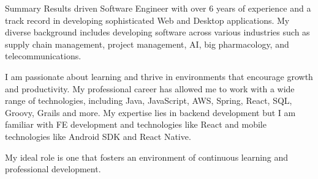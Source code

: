 \documentclass[]{mcdowellcv}
\begin{document}
   \makeheader

  \begin{cvsection}{Summary}
	    \hspace{\parindent} \hspace{\parindent} \hspace{\parindent} \hspace{\parindent} 
		Results driven Software Engineer with over 6 years of experience and a track record in developing sophisticated Web and Desktop applications. My diverse background includes developing software across various industries such as supply chain management, project management, AI, big pharmacology, and telecommunications.

		I am passionate about learning and thrive in environments that encourage growth and productivity. My professional career has allowed me to work with a wide range of technologies, including Java, JavaScript, AWS, Spring, React, SQL, Groovy, Grails and more. My expertise lies in backend development but I am familiar with FE development and technologies like React and mobile technologies like Android SDK and React Native.

		My ideal role is one that fosters an environment of continuous learning and professional development.	
  \end{cvsection}
\end{document}
